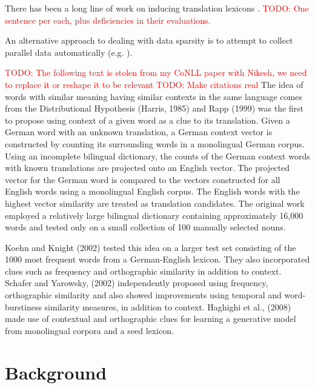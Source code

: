 \documentclass[11pt]{article}
\newcommand{\todo}[1]{\textcolor{red}{TODO: #1}}
\begin{document}
There has been a long line of work on inducing translation lexicons \cite{Rapp:1995,Rapp:1999}.
\todo{One sentence per each, plus deficiencies in their evaluations.}

An alternative approach to dealing with data sparsity is to attempt to collect parallel data automatically (e.g. \cite{Resnik:2003,Munteanu:2006,Smith:2010,Uszkoreit:2010}).

\todo{The following text is stolen from my CoNLL paper with Nikesh, we need to replace it or reshape it to be relevant}
\todo{Make citations real}
The idea of words with similar meaning having similar contexts in the same language comes from the Distributional Hypothesis (Harris, 1985) and Rapp (1999) was the first to propose using context of a given word as a clue to its translation. Given a German word with an unknown translation, a German context vector is constructed by counting its surrounding words in a monolingual German corpus.  Using an incomplete bilingual dictionary, the counts of the German context words with known translations are projected onto an English vector.  The projected vector for the German word is compared to the vectors constructed for all English words using a monolingual English corpus.  The English words with the highest vector similarity are treated as translation candidates.  The original work employed a relatively large bilingual dictionary containing approximately 16,000 words and tested only on a small collection of 100 manually selected nouns.

Koehn and Knight (2002) tested this idea on a larger test set consisting of the 1000 most frequent words from a German-English lexicon. They also incorporated clues such as frequency and orthographic similarity in addition to context. Schafer and Yarowsky, (2002) independently proposed using frequency, orthographic similarity and also showed improvements using temporal and word-burstiness similarity measures, in addition to context. Haghighi et al., (2008) made use of contextual and orthographic clues for learning a generative model from monolingual corpora and a seed lexicon.




\section{Background} \label{sect:bckg}
\end{document}
